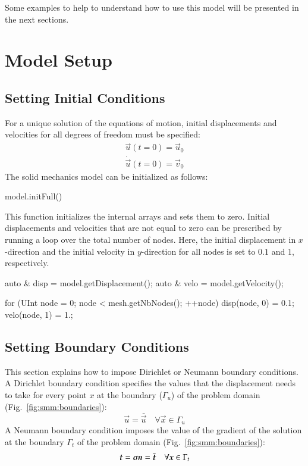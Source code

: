 Some examples to help to understand how to use this model will be
presented in the next sections.

\section{Model Setup}


\subsection{Setting Initial Conditions \label{sect:smm:initial_condition}}

For a unique solution of the equations of motion, initial
displacements and velocities for all degrees of freedom must be
specified:
\begin{eqnarray}
  \vec{u}(t=0) = \vec{u}_0\\
  \dot{\vec u}(t=0) =\vec{v}_0
\end{eqnarray} The solid mechanics model can be initialized as
follows:
\begin{cpp}
  model.initFull()
\end{cpp}
This function initializes the internal arrays and sets them to
zero. Initial displacements and velocities that are not equal to zero
can be prescribed by running a loop over the total number of
nodes. Here, the initial displacement in $x$-direction and the
initial velocity in $y$-direction for all nodes is set to $0.1$ and $1$,
respectively.
\begin{cpp}
auto & disp = model.getDisplacement();
auto & velo = model.getVelocity();

for (UInt node = 0; node < mesh.getNbNodes(); ++node) {
  disp(node, 0) = 0.1;
  velo(node, 1) = 1.;
}
\end{cpp}

\subsection{Setting Boundary Conditions\label{sect:smm:boundary}}
This section explains how to impose Dirichlet or Neumann boundary
conditions. A Dirichlet boundary condition specifies the values that
the displacement needs to take for every point $x$ at the boundary
($\Gamma_u$) of the problem domain (Fig.~\ref{fig:smm:boundaries}):
\begin{equation}
  \vec{u} = \bar{\vec u} \quad \forall \vec{x}\in
  \Gamma_{u}
\end{equation}
A Neumann boundary condition imposes the value of the gradient of the
solution at the boundary $\Gamma_t$ of the problem domain
(Fig.~\ref{fig:smm:boundaries}):
\begin{equation}
  \boldsymbol{t} = \boldsymbol{\sigma} \boldsymbol{n} = \bar{\boldsymbol{t}} \quad
  \forall \boldsymbol{x}\in \Gamma_{t}
\end{equation}

